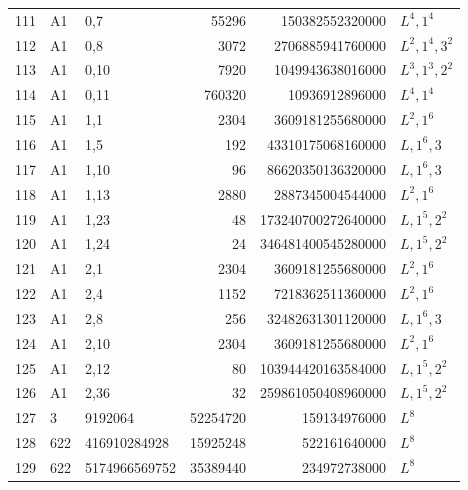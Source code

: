 \begin{longtable}{rllrrl}
111&A1&0,7&55296&150382552320000&$L^{4},1^{4}$\\
112&A1&0,8&3072&2706885941760000&$L^{2},1^{4},3^{2}$\\
113&A1&0,10&7920&1049943638016000&$L^{3},1^{3},2^{2}$\\
114&A1&0,11&760320&10936912896000&$L^{4},1^{4}$\\
115&A1&1,1&2304&3609181255680000&$L^{2},1^{6}$\\
116&A1&1,5&192&43310175068160000&$L,1^{6},3$\\
117&A1&1,10&96&86620350136320000&$L,1^{6},3$\\
118&A1&1,13&2880&2887345004544000&$L^{2},1^{6}$\\
119&A1&1,23&48&173240700272640000&$L,1^{5},2^{2}$\\
120&A1&1,24&24&346481400545280000&$L,1^{5},2^{2}$\\
121&A1&2,1&2304&3609181255680000&$L^{2},1^{6}$\\
122&A1&2,4&1152&7218362511360000&$L^{2},1^{6}$\\
123&A1&2,8&256&32482631301120000&$L,1^{6},3$\\
124&A1&2,10&2304&3609181255680000&$L^{2},1^{6}$\\
125&A1&2,12&80&103944420163584000&$L,1^{5},2^{2}$\\
126&A1&2,36&32&259861050408960000&$L,1^{5},2^{2}$\\
127&3&9192064&52254720&159134976000&$L^{8}$\\
128&622&416910284928&15925248&522161640000&$L^{8}$\\
129&622&5174966569752&35389440&234972738000&$L^{8}$\\
\end{longtable}
